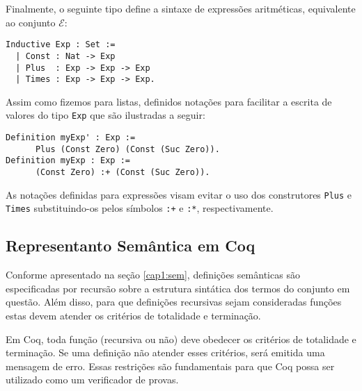 Finalmente, o seguinte tipo define a  sintaxe de express\~oes aritm\'eticas, equivalente ao conjunto $\mathcal{E}$:
\begin{lstlisting}
Inductive Exp : Set :=
  | Const : Nat -> Exp
  | Plus  : Exp -> Exp -> Exp
  | Times : Exp -> Exp -> Exp.
\end{lstlisting}
Assim como fizemos para listas, definidos nota\c{c}\~oes para facilitar a escrita de valores do tipo \texttt{Exp} que s\~ao ilustradas a seguir:
\begin{lstlisting}
Definition myExp' : Exp := 
      Plus (Const Zero) (Const (Suc Zero)).
Definition myExp : Exp := 
      (Const Zero) :+ (Const (Suc Zero)).
\end{lstlisting}
As nota\c{c}\~oes definidas para express\~oes visam evitar o uso dos construtores \texttt{Plus} e \texttt{Times} substituindo-os pelos s\'imbolos
\texttt{:+} e \texttt{:*}, respectivamente.

\subsection{Representanto Sem\^antica em Coq}

Conforme apresentado na se\c{c}\~ao \ref{cap1:sem}, defini\c{c}\~oes sem\^anticas s\~ao especificadas por recurs\~ao sobre a estrutura sint\'atica
dos termos do conjunto em quest\~ao. Al\'em disso, para que defini\c{c}\~oes recursivas sejam consideradas fun\c{c}\~oes estas devem atender
os crit\'erios de totalidade e termina\c{c}\~ao.

Em Coq, toda fun\c{c}\~ao (recursiva ou n\~ao) deve obedecer os crit\'erios de totalidade e termina\c{c}\~ao. Se uma defini\c{c}\~ao 
n\~ao atender esses crit\'erios, ser\'a emitida uma mensagem de erro. Essas restri\c{c}\~oes s\~ao fundamentais para que Coq possa ser 
utilizado como um verificador de provas.

